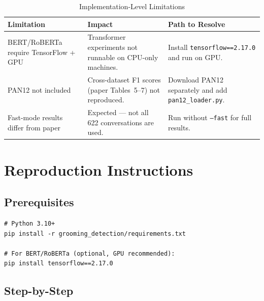 \documentclass[12pt,a4paper]{article}
\begin{document}
\begin{table}[H]
  \centering
  \caption{Implementation-Level Limitations}
  \begin{tabularx}{\linewidth}{>{\raggedright}p{4.5cm}
                               >{\raggedright}p{3.5cm}
                               X}
    \toprule
    \textbf{Limitation} & \textbf{Impact} & \textbf{Path to Resolve} \\
    \midrule
    BERT/RoBERTa require TensorFlow + GPU &
      Transformer experiments not runnable on CPU-only machines. &
      Install \texttt{tensorflow==2.17.0} and run on GPU. \\
    \addlinespace
    PAN12 not included &
      Cross-dataset F1 scores (paper Tables~5--7) not reproduced. &
      Download PAN12 separately and add \texttt{pan12\_loader.py}. \\
    \addlinespace
    Fast-mode results differ from paper &
      Expected --- not all 622 conversations are used. &
      Run without \texttt{--fast} for full results. \\
    \bottomrule
  \end{tabularx}
  \label{tab:impl_limits}
\end{table}

\section{Reproduction Instructions}

\subsection{Prerequisites}

\begin{lstlisting}
# Python 3.10+
pip install -r grooming_detection/requirements.txt

# For BERT/RoBERTa (optional, GPU recommended):
pip install tensorflow==2.17.0
\end{lstlisting}

\subsection{Step-by-Step}
\end{document}
